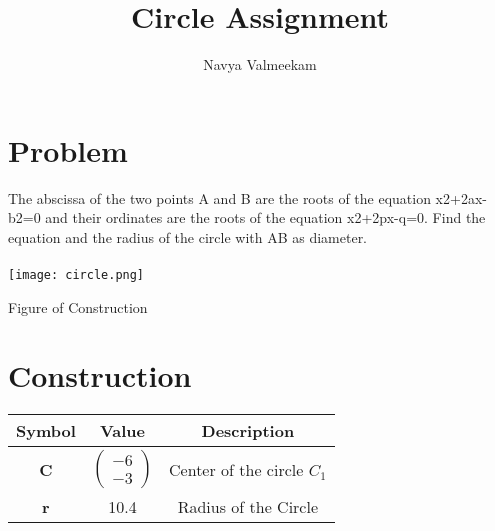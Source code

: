 \documentclass[journal,12pt,twocolumn]{IEEEtran}
\title{Circle Assignment}
\author{Navya Valmeekam}
\newcommand{\myvec}[1]{\ensuremath{\begin{pmatrix}#1\end{pmatrix}}}
\begin{document}
\providecommand{\norm}[1]{\left\lVert#1\right\rVert}
\maketitle
\begin{tableofcontents}
\section{Problem}
\noindent The abscissa of the two points A and B are the roots of the
equation x2+2ax-b2=0 and their ordinates are the roots of the equation x2+2px-q=0. Find the equation and the radius of the circle with AB as diameter.\\
\\
\texttt{[image: circle.png]} 
\begin{center}
Figure of Construction
\end{center}
\vspace{0.3cm}
\section{Construction}
\begin{center}
\begin{tabular}{|c|c|c|}
\hline
\textbf{Symbol}&{Value}&{Description}\\
\hline
\textbf{C}&$\myvec{-6 \\ -3}$&Center of the circle $C_1$\\
\hline
\textbf{r}&10.4&Radius of the Circle\\
\hline
\end{tabular}
\end{center}
\vspace{0.5cm}

\end{tableofcontents}
\end{document}
